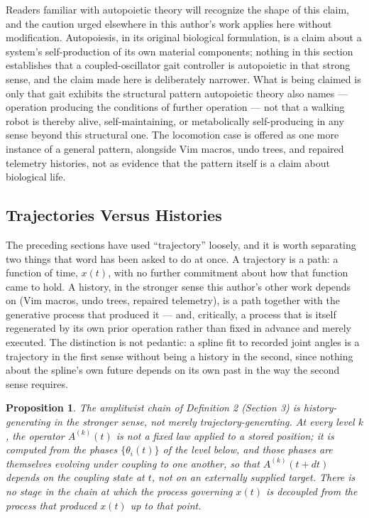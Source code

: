 \documentclass[12pt]{article}
\newtheorem{proposition}{Proposition}
\begin{document}
Readers familiar with autopoietic theory will recognize the shape of this claim, and the caution urged elsewhere in this author's work applies here without modification. Autopoiesis, in its original biological formulation, is a claim about a system's self-production of its own material components; nothing in this section establishes that a coupled-oscillator gait controller is autopoietic in that strong sense, and the claim made here is deliberately narrower. What is being claimed is only that gait exhibits the structural pattern autopoietic theory also names — operation producing the conditions of further operation — not that a walking robot is thereby alive, self-maintaining, or metabolically self-producing in any sense beyond this structural one. The locomotion case is offered as one more instance of a general pattern, alongside Vim macros, undo trees, and repaired telemetry histories, not as evidence that the pattern itself is a claim about biological life.

\subsection{Trajectories Versus Histories}

The preceding sections have used ``trajectory'' loosely, and it is worth separating two things that word has been asked to do at once. A trajectory is a path: a function of time, $x(t)$, with no further commitment about how that function came to hold. A history, in the stronger sense this author's other work depends on (Vim macros, undo trees, repaired telemetry), is a path together with the generative process that produced it — and, critically, a process that is itself regenerated by its own prior operation rather than fixed in advance and merely executed. The distinction is not pedantic: a spline fit to recorded joint angles is a trajectory in the first sense without being a history in the second, since nothing about the spline's own future depends on its own past in the way the second sense requires.

\begin{proposition}
The amplitwist chain of Definition 2 (Section 3) is history-generating in the stronger sense, not merely trajectory-generating. At every level $k$, the operator $A^{(k)}(t)$ is not a fixed law applied to a stored position; it is computed from the phases $\{\theta_i(t)\}$ of the level below, and those phases are themselves evolving under coupling to one another, so that $A^{(k)}(t + dt)$ depends on the coupling state at $t$, not on an externally supplied target. There is no stage in the chain at which the process governing $x(t)$ is decoupled from the process that produced $x(t)$ up to that point.
\end{proposition}
\end{document}
